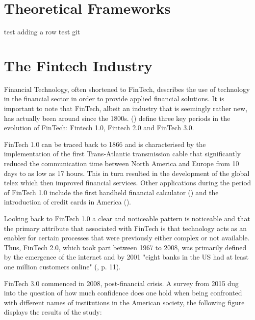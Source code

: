 \documentclass[11pt,a4paper]{article}
\begin{document}
\section{Theoretical Frameworks}
test
adding a row test git


\newpage
\section{The Fintech Industry} %
\label{fintech_industry}

Financial Technology, often shortened to FinTech, describes the use of technology in the financial sector in order to provide applied financial solutions.  It is important to note that FinTech, albeit an industry that is seemingly rather new, has actually been around since the 1800s. \citeauthor{buckleyEvolutionFintechNew2016} (\citeyear{buckleyEvolutionFintechNew2016}) define three key periods in the evolution of FinTech: Fintech 1.0, Fintech 2.0 and FinTech 3.0.\par
FinTech 1.0 can be traced back to 1866 and is characterised by the implementation of the first Trans-Atlantic transmission cable that significantly reduced the communication time between North America and Europe from 10 days to as low as 17 hours. This in turn resulted in the development of the global telex which then improved financial services. Other applications during the period of FinTech 1.0 include the first handheld financial calculator (\cite{thibodeauTIFirstHandheld2007}) and the introduction of credit cards in America (\cite{markhamFinancialHistoryUnited2015}). \par
Looking back to FinTech 1.0 a clear and noticeable pattern is noticeable and that the primary attribute that associated with FinTech is that technology acts as an enabler for certain processes that were previously either complex or not available. Thus, FinTech 2.0, which took part between 1967 to 2008, was primarily defined by the emergence of the internet and by 2001 "eight banks in the US had at least one million customers online"  (\cite{buckleyEvolutionFintechNew2016}, p. 11). \par 
FinTech 3.0 commenced in 2008, post-financial crisis. A survey from 2015 dug into the question of how much confidence does one hold when being confronted with different names of institutions in the American society,  the following figure displays the results of the study:
\end{document}
